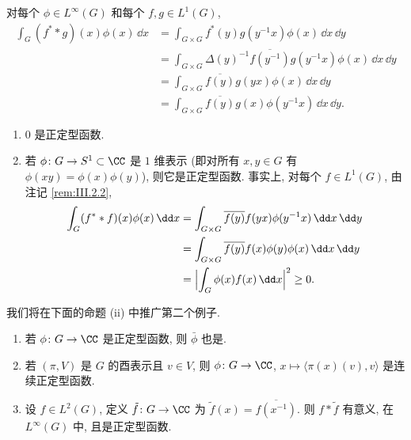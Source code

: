 \begin{remark}[卷积与正定型]
\label{rem:III.2.2}
对每个 $\phi \in L^{\infty}(G)$ 和每个 $f, g \in L^1(G)$,
\begin{align*}
\int_G (f^* * g)(x)\phi(x)\,\dd x &= \int_{G \times G}f^*(y)g(y^{-1}x)\phi(x)\,\dd x\,\dd y \\
&= \int_{G \times G}\Delta(y)^{-1}\overline{f(y^{-1})}g(y^{-1}x)\phi(x)\,\dd x\,\dd y \\
&= \int_{G \times G}\overline{f(y)}g(yx)\phi(x)\,\dd x\,\dd y \\
&= \int_{G \times G}\overline{f(y)}g(x)\phi(y^{-1}x)\,\dd x\,\dd y.
\end{align*}
\end{remark}

\begin{example}[正定型函数的例子]
\label{exa:III.2.3}
\begin{enumerate}
\item[(1)] $0$ 是正定型函数.
\item[(2)] 若 $\phi \colon G \to S^1 \subset \CC$ 是 $1$ 维表示 (即对所有 $x, y \in G$ 有 $\phi(xy) = \phi(x)\phi(y)$), 则它是正定型函数. 事实上, 对每个 $f \in L^1(G)$, 由注记 \ref{rem:III.2.2},
\begin{align*}
\int_G (f^* * f)(x)\phi(x)\,\dd x &= \int_{G \times G}\overline{f(y)}f(yx)\phi(y^{-1}x)\,\dd x\,\dd y \\
&= \int_{G \times G}\overline{f(y)}f(x)\phi(y)\phi(x)\,\dd x\,\dd y \\
&= \Bigl|\int_G \phi(x)f(x)\,\dd x\Bigr|^2 \geq 0.
\end{align*}
\end{enumerate}
我们将在下面的命题 (ii) 中推广第二个例子.
\end{example}

\begin{proposition}[正定型函数的来源]
\label{prop:III.2.4}
\begin{enumerate}
\item[(i)] 若 $\phi \colon G \to \CC$ 是正定型函数, 则 $\bar{\phi}$ 也是.
\item[(ii)] 若 $(\pi, V)$ 是 $G$ 的酉表示且 $v \in V$, 则 $\phi \colon G \to \CC$, $x \longmapsto \langle \pi(x)(v), v \rangle$ 是连续正定型函数.
\item[(iii)] 设 $f \in L^2(G)$, 定义 $\tilde{f} \colon G \to \CC$ 为 $\tilde{f}(x) = \overline{f(x^{-1})}$. 则 $f * \tilde{f}$ 有意义, 在 $L^{\infty}(G)$ 中, 且是正定型函数.
\end{enumerate}
\end{proposition}

